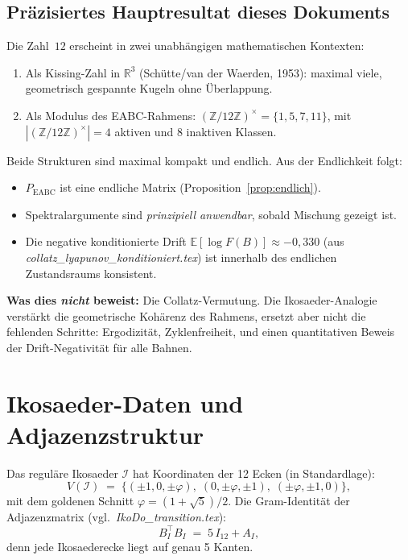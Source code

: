 \documentclass[12pt,a4paper]{article}
\newcommand{\Z}{\mathbb{Z}}
\newcommand{\R}{\mathbb{R}}
\newcommand{\E}{\mathbb{E}}
\newcommand{\logF}{\log F(B)}
\begin{document}
\subsection{Präzisiertes Hauptresultat dieses Dokuments}

\begin{tcolorbox}[hauptsatz, title={Stärkster beweisbarer Satz (dieses Dokuments)}]
Die Zahl~$12$ erscheint in zwei unabhängigen mathematischen Kontexten:
\begin{enumerate}[noitemsep]
  \item Als Kissing-Zahl in $\R^3$ (Schütte/van der Waerden, 1953):
        maximal viele, geometrisch gespannte Kugeln ohne Überlappung.
  \item Als Modulus des EABC-Rahmens: $(\Z/12\Z)^\times = \{1, 5, 7, 11\}$,
        mit $|(\Z/12\Z)^\times| = 4$ aktiven und $8$ inaktiven Klassen.
\end{enumerate}

\medskip
Beide Strukturen sind maximal kompakt und endlich.
Aus der Endlichkeit folgt:
\begin{itemize}[noitemsep]
  \item $P_{\text{EABC}}$ ist eine endliche Matrix (Proposition~\ref{prop:endlich}).
  \item Spektralargumente sind \emph{prinzipiell anwendbar}, sobald Mischung
        gezeigt ist.
  \item Die negative konditionierte Drift
        $\E[\logF] \approx -0{,}330$ (aus
        \textit{collatz\_lyapunov\_konditioniert.tex}) ist innerhalb
        des endlichen Zustandsraums konsistent.
\end{itemize}

\medskip
\textbf{Was dies \emph{nicht} beweist:}
Die Collatz-Vermutung.
Die Ikosaeder-Analogie verstärkt die geometrische Kohärenz des Rahmens,
ersetzt aber nicht die fehlenden Schritte: Ergodizität, Zyklenfreiheit,
und einen quantitativen Beweis der Drift-Negativität für alle Bahnen.
\end{tcolorbox}

\appendix
\section{Ikosaeder-Daten und Adjazenzstruktur}
\label{app:iko}

Das reguläre Ikosaeder $\mathcal{I}$ hat Koordinaten der 12 Ecken
(in Standardlage):
\[
  V(\mathcal{I}) \;=\; \bigl\{
    (\pm 1, 0, \pm\varphi),\;
    (0, \pm\varphi, \pm 1),\;
    (\pm\varphi, \pm 1, 0)
  \bigr\},
\]
mit dem goldenen Schnitt $\varphi = (1+\sqrt{5})/2$.
Die Gram-Identität der Adjazenzmatrix (vgl.\ \textit{IkoDo\_transition.tex}):
\[
  B_I^\top B_I \;=\; 5\,I_{12} + A_I,
\]
denn jede Ikosaederecke liegt auf genau 5 Kanten.
\end{document}
